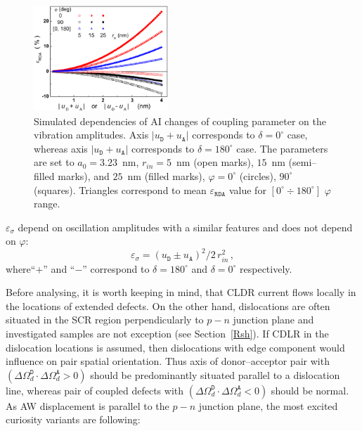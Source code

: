 \documentclass[aip,jap, amsmath,amssymb,reprint]{revtex4-1}
\begin{document}
\begin{figure}
\includegraphics[width=0.45\textwidth]{olikhFig5}%
\caption{\label{fig_Erda}
Simulated dependencies of AI changes of coupling parameter on the vibration amplitudes.
Axis $|u_\mathtt{D}+u_\mathtt{A}|$ corresponds to $\delta=0^\circ$ case, whereas axis $|u_\mathtt{D}+u_\mathtt{A}|$ corresponds to $\delta=180^\circ$ case.
The parameters are set to $a_0=3.23$~nm, 
$r_{in}=5$~nm (open marks), $15$~nm (semi--filled marks), and $25$~nm (filled marks),
$\varphi=0^\circ$ (circles), $90^\circ$ (squares).
Triangles correspond to mean $\varepsilon_{\mathtt{RDA}}$ value for $[0^\circ\div 180^\circ]$ $\varphi$ range.
}%
\end{figure}

$\varepsilon_{\sigma}$ depend on oscillation amplitudes with a similar features and 
does not depend on $\varphi$: 
\begin{equation}
\label{eqEpsSig}
\varepsilon_{\sigma}=(u_\mathtt{D}\pm u_\mathtt{A})^2/2\,r_{in}^2\,,
\end{equation}
where``$+$'' and ``$-$'' correspond to $\delta=180^\circ$ and $\delta=0^\circ$ respectively.

Before analysing, it is worth keeping in mind, that 
CLDR current flows locally in the locations of extended defects\cite{CDLR:JAP,CDLR:SSP}.
On the other hand, dislocations are often situated in the SCR region perpendicularly to $p-n$ junction plane 
and investigated samples are not exception (see Section~\ref{Rsh}).
If CDLR in the dislocation locations is assumed, then dislocations with edge component would influence on pair spatial orientation.
Thus axis of donor--acceptor pair with $(\Delta\Omega_d^\mathtt{D}\cdot\Delta\Omega_d^\mathtt{A}>0)$  should be predominantly situated parallel to a dislocation line,
whereas pair of coupled defects with $(\Delta\Omega_d^\mathtt{D}\cdot\Delta\Omega_d^\mathtt{A}<0)$ should be normal.
As AW displacement is parallel to the $p-n$ junction plane,
the most excited curiosity variants are following:
\end{document}
